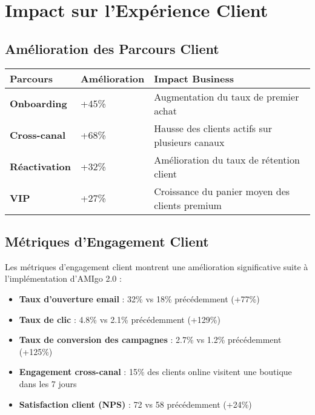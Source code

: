 \section{Impact sur l'Expérience Client}

\subsection{Amélioration des Parcours Client}

\begin{center}
\begin{tabular}{|>{\bfseries}p{4cm}|p{3cm}|p{6.5cm}|}
\hline
\rowcolor{lightblue} Parcours & Amélioration & Impact Business \\
\hline
Onboarding & +45\% & Augmentation du taux de premier achat \\
\hline
Cross-canal & +68\% & Hausse des clients actifs sur plusieurs canaux \\
\hline
Réactivation & +32\% & Amélioration du taux de rétention client \\
\hline
VIP & +27\% & Croissance du panier moyen des clients premium \\
\hline
\end{tabular}
\end{center}

\subsection{Métriques d'Engagement Client}

\begin{mdframed}[backgroundcolor=lightgreen!20, linewidth=1pt]
Les métriques d'engagement client montrent une amélioration significative suite à l'implémentation d'AMIgo 2.0 :

\begin{itemize}
    \item \textbf{Taux d'ouverture email} : 32\% vs 18\% précédemment (+77\%)
    \item \textbf{Taux de clic} : 4.8\% vs 2.1\% précédemment (+129\%)
    \item \textbf{Taux de conversion des campagnes} : 2.7\% vs 1.2\% précédemment (+125\%)
    \item \textbf{Engagement cross-canal} : 15\% des clients online visitent une boutique dans les 7 jours
    \item \textbf{Satisfaction client (NPS)} : 72 vs 58 précédemment (+24\%)
\end{itemize}
\end{mdframed}


